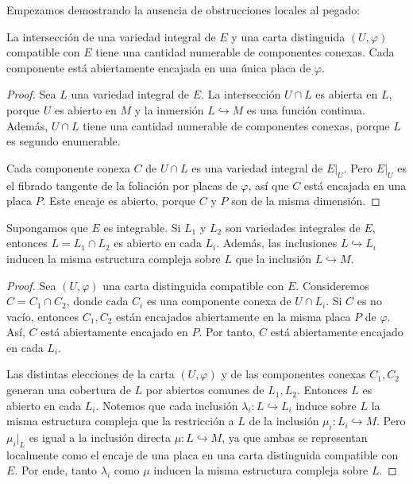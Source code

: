 Empezamos demostrando la ausencia de obstrucciones locales al pegado:

\begin{proposition}
La intersección de una variedad integral de $E$ y una carta distinguida $(U, \varphi)$ compatible con $E$ tiene una cantidad numerable de componentes conexas. Cada componente está abiertamente encajada en una única placa de $\varphi$.
\end{proposition}

\begin{proof}
Sea $L$ una variedad integral de $E$. La intersección $U \cap L$ es abierta en $L$, porque $U$ es abierto en $M$ y la inmersión $L \hookrightarrow M$ es una función continua. Además, $U \cap L$ tiene una cantidad numerable de componentes conexas, porque $L$ es segundo enumerable.

Cada componente conexa $C$ de $U \cap L$ es una variedad integral de $E \vert_U$. Pero $E \vert_U$ es el fibrado tangente de la foliación por placas de $\varphi$, así que $C$ está encajada en una placa $P$. Este encaje es abierto, porque $C$ y $P$ son de la misma dimensión.
\end{proof}

\begin{proposition}
Supongamos que $E$ es integrable. Si $L_1$ y $L_2$ son variedades integrales de $E$, entonces $L = L_1 \cap L_2$ es abierto en cada $L_i$. Además, las inclusiones $L \hookrightarrow L_i$ inducen la misma estructura compleja sobre $L$ que la inclusión $L \hookrightarrow M$.
\end{proposition}

\begin{proof}
Sea $(U, \varphi)$ una carta distinguida compatible con $E$. Consideremos $C = C_1 \cap C_2$, donde cada $C_i$ es una componente conexa de $U \cap L_i$. Si $C$ es no vacío, entonces $C_1, C_2$ están encajados abiertamente en la misma placa $P$ de $\varphi$. Así, $C$ está abiertamente encajado en $P$. Por tanto, $C$ está abiertamente encajado en cada $L_i$.

Las distintas elecciones de la carta $(U, \varphi)$ y de las componentes conexas $C_1, C_2$ generan una cobertura de $L$ por abiertos comunes de $L_1, L_2$. Entonces $L$ es abierto en cada $L_i$. Notemos que cada inclusión $\lambda_i : L \hookrightarrow L_i$ induce sobre $L$ la misma estructura compleja que la restricción a $L$ de la inclusión $\mu_i : L_i \hookrightarrow M$. Pero $\mu_i \vert_L$ es igual a la inclusión directa $\mu : L \hookrightarrow M$, ya que ambas se representan localmente como el encaje de una placa en una carta distinguida compatible con $E$. Por ende, tanto $\lambda_i$ como $\mu$ inducen la misma estructura compleja sobre $L$.
\end{proof}

